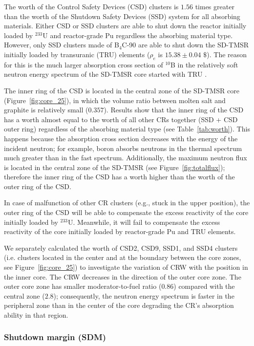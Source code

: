 The worth of the Control Safety Devices (CSD) clusters is $1.56$ times greater than 
the worth of the Shutdown Safety Devices (SSD) system for all absorbing materials. Either CSD or SSD 
clusters are able to shut down the reactor initially loaded by 
$^{233}$U and reactor-grade Pu regardless the absorbing material type.
However, only SSD clusters made of B$_4$C-90 are able to shut down the SD-TMSR 
initially loaded by transuranic (TRU) elements ($\rho_e$ is $15.38\pm0.04$ $\$$).
The reason for this is the much larger 
absorption cross section of $^{10}$B in the relatively soft neutron energy 
spectrum of the SD-TMSR core started with TRU \cite{ashraf2020Strategies}.

The inner ring of the CSD is located in the central zone of the SD-TMSR core 
(Figure~\ref{fig:core_25}), in which the volume ratio between molten salt and 
graphite is relatively small ($0.357$). Results show that the inner ring of the CSD has 
a worth almost equal to the worth of all other CRs together (SSD + CSD outer ring) regardless of 
the absorbing material type (see Table~\ref{tab:worth}). This happens because the absorption cross section
decreases with the energy of the incident neutron; for example, boron absorbs neutrons in the thermal spectrum much 
greater than in the fast spectrum. Additionally, the maximum neutron flux is located in the central zone of the SD-TMSR (see Figure~\ref{fig:totalflux}); therefore the inner ring of the CSD has a worth higher than the worth of the outer ring of the CSD.

In case of malfunction of other CR clusters (e.g., stuck in the upper 
position), the outer ring of the CSD will be able to compensate the excess reactivity of the core initially loaded by $^{233}$U.
Meanwhile, it will fail to compensate the excess 
reactivity of the core initially loaded by reactor-grade Pu and TRU elements.

We separately calculated the worth of CSD2, CSD9, SSD1, and SSD4 clusters (i.e. clusters located in the center and at the boundary between the core
zones, see Figure~\ref{fig:core_25}) to investigate the variation of CRW with the position in the inner core.
The CRW decreases in the direction of the outer core zone. The outer core zone 
has smaller moderator-to-fuel ratio ($0.86$) compared with the central zone 
($2.8$); consequently, the neutron energy spectrum is faster in the peripheral 
zone than in the center of the core degrading the CR's 
absorption ability in that region.

\subsubsection{Shutdown margin (SDM)}

